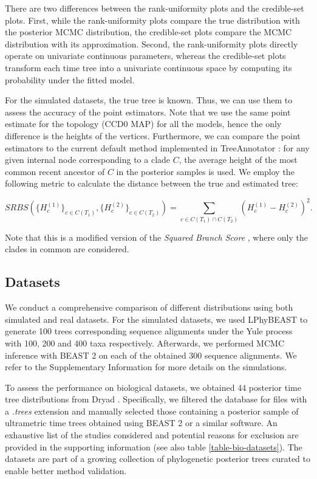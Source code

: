 \documentclass[10pt,letterpaper]{article}
\begin{document}
There are two differences between the rank-uniformity plots and the credible-set plots. First, while the rank-uniformity plots compare the true distribution with the posterior MCMC distribution, the credible-set plots compare the MCMC distribution with its approximation. Second, the rank-uniformity plots directly operate on univariate continuous parameters, whereas the credible-set plots transform each time tree into a univariate continuous space by computing its probability under the fitted model.

For the simulated datasets, the true tree is known. Thus, we can use them to assess the accuracy of the point estimators. Note that we use the same point estimate for the topology (CCD0 MAP) for all the models, hence the only difference is the heights of the vertices. Furthermore, we can compare the point estimators to the current default method implemented in TreeAnnotator \cite{treeannotator}: for any given internal node corresponding to a clade $C$, the average height of the most common recent ancestor of $C$ in the posterior samples is used. We employ the following metric to calculate the distance between the true and estimated tree:

$$
SRBS\left(\{H^{(1)}_c\}_{c \in C(T_1)}, \{H^{(2)}_c\}_{c \in C(T_2)}\right) = \sum_{c \in C(T_1) \cap C(T_2)} \left(H^{(1)}_c-H^{(2)}_c\right)^2 .
$$

Note that this is a modified version of the \emph{Squared Branch Score} \cite{treesinforest}, where only the clades in common are considered.



\subsection*{Datasets}

We conduct a comprehensive comparison of different distributions using both simulated and real datasets. For the simulated datasets, we used LPhyBEAST \cite{linguaphylo} to generate 100 trees corresponding sequence alignments under the Yule process with 100, 200 and 400 taxa respectively. Afterwards, we performed MCMC inference with BEAST 2 \cite{beast2} on each of the obtained 300 sequence alignments. We refer to the Supplementary Information for more details on the simulations.

To assess the performance on biological datasets, we obtained 44 posterior time tree distributions from Dryad \cite{dryad}. Specifically, we filtered the database for files with a \emph{.trees} extension and manually selected those containing a posterior sample of ultrametric time trees obtained using BEAST 2 or a similar software. An exhaustive list of the studies considered and potential reasons for exclusion are provided in the supporting information (see also table \ref{table-bio-datasets}). The datasets are part of a growing collection of phylogenetic posterior trees \cite{tree_dataset} curated to enable better method validation.
\end{document}
